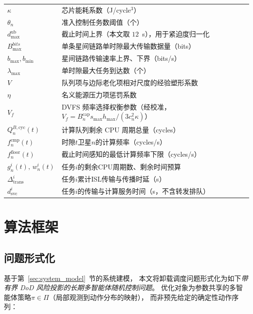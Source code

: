 \documentclass[a4paper,11pt]{article}
\begin{document}
\begin{table}[t]
\begin{tabular}{ll}
$\kappa$ & 芯片能耗系数（J/cycle$^3$） \\
$\theta_n$ & 准入控制任务数阈值（个） \\
$d^{\mathrm{ub}}_{\max}$ & 截止时间上界（本文取 $12$~s），用于紧迫度归一化 \\
$B^{bits}_{\max}$ & 单条星间链路单时隙最大传输数据量（bits） \\
$b_{\max}, b_{\min}$ & 星间链路传输速率上界、下界（bits/s） \\
$\lambda_{\max}$ & 单时隙最大任务到达数（个） \\
$V$ & 队列项与边际老化项相对尺度的经验塑形系数 \\
$\eta$ & 名义能源压力项惩罚系数 \\
$V_f$ & DVFS 频率选择权衡参数（经校准，$V_f=B^{\mathrm{cap}}_n s_{\max} h_{\max}/(3c_n^2\kappa)$） \\
$Q^{B,\mathrm{cyc}}_n(t)$ & 计算队列剩余 CPU 周期总量（cycles） \\
$f^{\mathrm{cmp}}_n(t)$ & 时隙$t$卫星$n$的计算频率（cycles/s） \\
$f^{\mathrm{floor}}_n(t)$ & 截止时间感知的最低计算频率下限（cycles/s） \\
$g^i_n(t),\,w^i_n(t)$ & 任务$i$的剩余CPU周期数、剩余时间预算 \\
$\Delta^i_{\mathrm{trans}}$ & 任务$i$累计ISL传输与传播时延（s） \\
$d^i_{\mathrm{svc}}$ & 任务$i$的传输与计算服务时间（s，不含转发排队） \\
\bottomrule
\end{tabular}
\end{table}

\section{算法框架}
\label{sec:algorithm}

\subsection{问题形式化}

基于第~\ref{sec:system_model}~节的系统建模，
本文将卸载调度问题形式化为如下\emph{带有界 DoD 风险投影的长期多智能体随机控制问题}。
优化对象为参数共享的多智能体策略$\pi\in\Pi$（局部观测到动作分布的映射），
而非预先给定的确定性动作序列：
\end{document}
